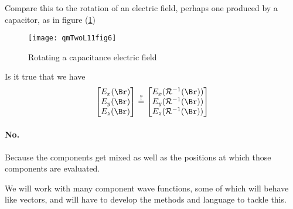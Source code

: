 Compare this to the rotation of an electric field, perhaps one produced by a capacitor, as in figure (\ref{fig:qmTwoL11:qmTwoL11fig6})

\begin{figure}[htp]
   \centering
   \texttt{[image: qmTwoL11fig6]}
   \caption{Rotating a capacitance electric field}\label{fig:qmTwoL11:qmTwoL11fig6}
\end{figure}

Is it true that we have
\begin{equation}\label{eqn:qmTwoL11:650}
\begin{bmatrix}
E_x(\Br) \\
E_y(\Br) \\
E_z(\Br) 
\end{bmatrix}
\stackrel{?}{=}
\begin{bmatrix}
E_x(\mathcal{R}^{-1}(\Br)) \\
E_y(\mathcal{R}^{-1}(\Br)) \\
E_z(\mathcal{R}^{-1}(\Br)) 
\end{bmatrix}
\end{equation}

\paragraph{No.}  Because the components get mixed as well as the positions at which those components are evaluated.

We will work with many component wave functions, some of which will behave like vectors, and will have to develop the methods and language to tackle this.

\EndArticle

